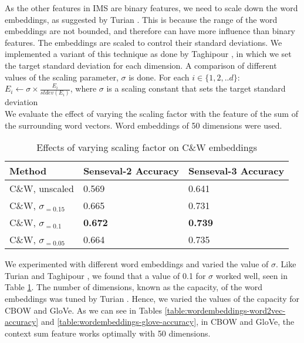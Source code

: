 As the other features in IMS are binary features, we need to scale down the word embeddings, as suggested by Turian . This is because the range of the word embeddings are not bounded, and therefore can have more influence than binary features. The embeddings are scaled to control their standard deviations. We implemented a variant of this technique as done by Taghipour , in which we set the target standard deviation for each dimension. A comparison of different values of the scaling parameter, $\sigma$ is done. For each $i \in \{1, 2, .. d\}$:
\\

$E_{i} \leftarrow \sigma \times \frac{E_{i}}{stdev(E_{i})} $, where $\sigma$ is a scaling constant that sets the target standard deviation
\\ 

We evaluate the effect of varying the scaling factor with the feature of the sum of the surrounding word vectors. Word embeddings of 50 dimensions were used.



\begin{table}[ht]
	\caption{Effects of varying scaling factor on C\&W embeddings }
	\label{table:wordembeddings-accuracy}
	\begin{center}
		\begin{tabular}{| p{7cm} | p{4cm} | p{4cm} |}
			\hline
			Method & Senseval-2 Accuracy & Senseval-3 Accuracy \\
			\hline
			C\&W, unscaled & 0.569 & 0.641 \\
			\hline
			C\&W, $\sigma _{=0.15}$ & 0.665 & 0.731 \\
			\hline
			C\&W, $\sigma _{=0.1}$ & {\bf0.672} & {\bf0.739} \\
			\hline
			C\&W, $\sigma _{=0.05}$ & 0.664 & 0.735 \\
			\hline
			
		\end{tabular}
	\end{center}
\end{table}
We experimented with different word embeddings and varied the value of $\sigma$. Like Turian  and Taghipour , we found that a value of 0.1 for $\sigma$ worked well, seen in Table \ref{table:wordembeddings-accuracy}. The number of dimensions, known as the capacity, of the word embeddings was tuned by Turian . Hence, we varied the values of the capacity for CBOW and GloVe. As we can see in Tables \ref{table:wordembeddings-word2vec-accuracy} and \ref{table:wordembeddings-glove-accuracy}, in CBOW and GloVe, the context sum feature works optimally with 50 dimensions. 


